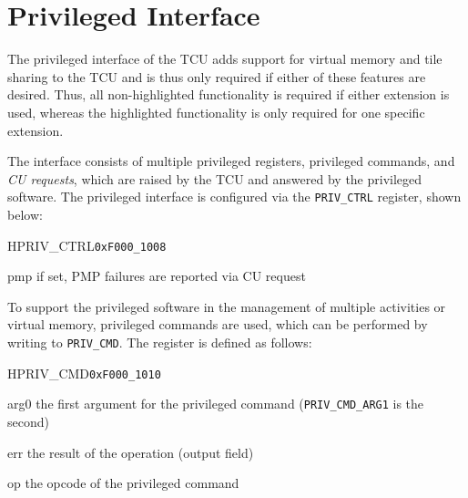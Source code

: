 \chapter{Privileged Interface}

The privileged interface of the TCU adds support for virtual memory and tile sharing to the TCU and is
thus only required if either of these features are desired. Thus, all non-highlighted functionality
is required if either extension is used, whereas the highlighted functionality is only required for
one specific extension.

The interface consists of multiple privileged registers, privileged commands, and \emph{CU
requests}, which are raised by the TCU and answered by the privileged software. The privileged
interface is configured via the \texttt{PRIV\_CTRL} register, shown below:

\setlength{\regWidth}{.95\textwidth}
\begin{register}{H}{PRIV\_CTRL}{\texttt{0xF000\_1008}}
  \regnewline%
  \begin{regdesc}\begin{reglist}
    \item[pmp] if set, PMP failures are reported via CU request
  \end{reglist}\end{regdesc}
\end{register}
\setlength{\regWidth}{\textwidth}

To support the privileged software in the management of multiple activities or virtual memory,
privileged commands are used, which can be performed by writing to \texttt{PRIV\_CMD}. The register
is defined as follows:

\begin{register}{H}{PRIV\_CMD}{\texttt{0xF000\_1010}}
  \regnewline%
  \begin{regdesc}\begin{reglist}
    \item[arg0] the first argument for the privileged command (\texttt{PRIV\_CMD\_ARG1} is the second)
    \item[err] the result of the operation (output field)
    \item[op] the opcode of the privileged command
  \end{reglist}\end{regdesc}
\end{register}

